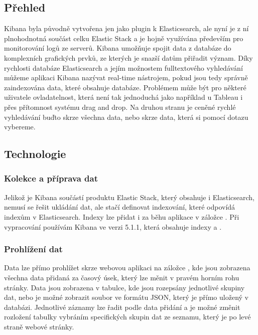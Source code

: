 \documentclass[czech,BP]{thesiskiv}
\begin{document}
 \subsection{Přehled}
 Kibana byla původně vytvořena jen jako plugin k Elasticsearch, ale nyní je z ní plnohodnotná součást celku Elastic Stack a je hojně využívána především pro monitorování logů ze serverů. Kibana umožňuje spojit data z databáze do komplexních grafických prvků, ze kterých je snazší datům přiřadit význam. Díky rychlosti databáze Elasticsearch a jejím možnostem fulltextového vyhledávání můžeme aplikaci Kibana nazývat real-time nástrojem, pokud jsou tedy správně zaindexována data, které obsahuje databáze. Problémem může být pro některé uživatele ovladatelnost, která není tak jednoduchá jako například u Tableau i přes přítomnost systému drag and drop. Na druhou stranu je ceněné rychlé vyhledávání buďto skrze všechna data, nebo skrze data, která si pomocí dotazu vybereme.
 \subsection{Technologie}
 \subsubsection{Kolekce a příprava dat}
 Jelikož je Kibana součástí produktu Elastic Stack, který obsahuje i Elasticsearch, nemusí se řešit ukládání dat, ale stačí definovat indexování, které odpovídá indexům v Elasticsearch. Indexy lze přidat i za běhu aplikace v záložce . Při vypracování používám Kibana ve verzi 5.1.1, která obsahuje indexy  a .
 \subsubsection{Prohlížení dat}
 Data lze přímo prohlížet skrze webovou aplikaci na záložce , kde jsou zobrazena všechna data přidaná za časový úsek, který lze měnit v pravém horním rohu stránky. Data jsou zobrazena v tabulce, kde jsou rozepsány jednotlivé skupiny dat, nebo je možné zobrazit soubor ve formátu JSON, který je přímo uložený v databázi. Jednotlivé záznamy lze řadit podle data přidání a je možné změnit rozložení tabulky vybráním specifických skupin dat ze seznamu, který je po levé straně webové stránky.
\end{document}

